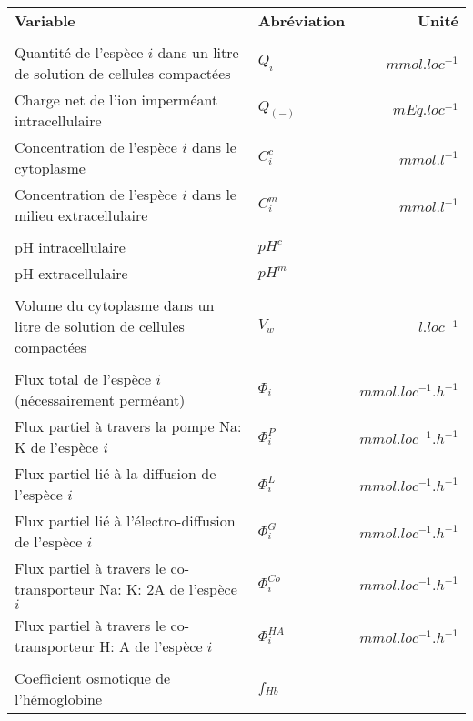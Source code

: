 \documentclass[a4paper,fleqn]{article}
\begin{document}
\begin{tabular}{p{8cm}lr}

\textbf{Variable}                                                      & \textbf{Abréviation}     & \textbf{Unité}      \\
\\
Quantité de l'espèce $i$ dans un litre de solution de cellules compactées  & $Q_i$                    & $mmol.loc^{-1}$     \\
Charge net de l'ion imperméant intracellulaire                         & $Q_{(-)}$               & $mEq.loc^{-1}$      \\
Concentration de l'espèce $i$ dans le cytoplasme                           & $C_{i}^{c}$              & $mmol.l^{-1}$       \\
Concentration de l'espèce $i$ dans le milieu extracellulaire               & $C_{i}^{m}$              & $mmol.l^{-1}$       \\\\

pH intracellulaire                                                     & $pH^c$                                         \\
pH extracellulaire                                                     & $pH^m$                                         \\\\

Volume du cytoplasme dans un litre de solution de cellules compactées & $V_w$                    & $l.loc^{-1}$        \\\\

Flux total de l'espèce $i$ (nécessairement perméant)                       & $\Phi_i$                 & $mmol.loc^{-1}.h^{-1}$\\
Flux partiel à travers la pompe Na: K de l'espèce $i$                      & $\Phi_{i}^{P}$           & $mmol.loc^{-1}.h^{-1}$\\
Flux partiel lié à la diffusion de l'espèce $i$                             & $\Phi_{i}^{L}$           & $mmol.loc^{-1}.h^{-1}$\\
Flux partiel lié à l'électro-diffusion de l'espèce $i$                      & $\Phi_{i}^{G}$           & $mmol.loc^{-1}.h^{-1}$\\
Flux partiel à travers le co-transporteur Na: K: 2A de l'espèce $i$         & $\Phi_{i}^{Co}$          & $mmol.loc^{-1}.h^{-1}$\\
Flux partiel à travers le co-transporteur H: A de l'espèce $i$              & $\Phi_{i}^{HA}$          & $mmol.loc^{-1}.h^{-1}$\\\\

Coefficient osmotique de l'hémoglobine                                 & $f_{Hb}$                                       \\
\end{tabular}\\
\end{document}
